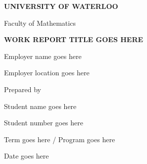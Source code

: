
\begin{center}
    
    \textbf{UNIVERSITY OF WATERLOO}
        
    Faculty of Mathematics
        
    \vfill
        
    \textbf{WORK REPORT TITLE GOES HERE}
        
    \vfill
    
    Employer name goes here
    
    Employer location goes here
    
    \vfill
    
    Prepared by
    
    Student name goes here
    
    Student number goes here
    
    Term goes here / Program goes here
        
    Date goes here
    
    \newpage
\end{center}
